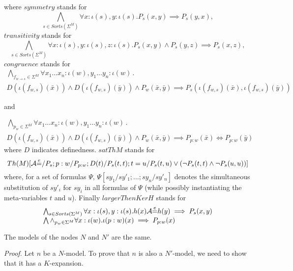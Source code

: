 \begin{itemize}
where $\mathit{symmetry}$ stands for
$$\bigwedge_{s\in Sorts(\Sigma^M)} \forall x:{\iota(s)},y:{\iota(s)}.P_s(x,y)\implies P_s(y, x),$$
$\mathit{transitivity}$ stands for
$$\bigwedge_{s\in Sorts(\Sigma^M)} \forall x:{\iota(s)},y:{\iota(s)},z:{\iota(s)}.P_s(x, y)\land P_s(y, z)\implies P_s(x, z),$$
$\mathit{congruence}$ stands for
$$
\begin{array}{l}
\bigwedge_{f_{w\rightarrow s}\in\Sigma^M} \forall x_1\ldots x_n:{\iota(w)},y_1\ldots y_n:{\iota(w)}\,.\,\,\\
D(\iota(f_{w,s})(\bar{x}))\land D(\iota(f_{w,s})(\bar{y}))\land P_w(\bar{x},\bar{y})
\implies P_s(\iota(f_{w,s})(\bar{x}),\iota(f_{w,s})(\bar{y}))
\end{array}
$$ 

and

$$
\begin{array}{l}
\bigwedge_{p_w \in\Sigma^M} \forall x_1\ldots x_n:{\iota(w)},y_1\ldots y_n:{\iota(w)}\,.\,\,\\
D(\iota(f_{w,s})(\bar{x}))\land D(\iota(f_{w,s})(\bar{y}))\land P_w(\bar{x},\bar{y})
\implies P_{p:w}(\bar{x}) \Leftrightarrow P_{p:w}(\bar{y})
\end{array}
$$
\noindent where $D$ indicates definedness. $\mathit{satThM}$ stands for
$$Th(M)[\mathcal{A}{\stackrel{e}{=}}/P_s; p:w/P_{p:w}; D(t)/P_s(t,t); t=u/P_s(t,u)\lor(\neg P_s(t,t)\land\neg P_s(u,u))]$$
where, for a set of formulas $\Psi$, $\Psi[sy_1/sy'_1;\ldots ;sy_n/sy'_n]$
denotes the simultaneous substitution of $sy'_i$ for $sy_i$ in
all formulas of $\Psi$ (while possibly instantiating the meta-variables
$t$ and $u$).
%
Finally $\mathit{largerThenKerH}$ stands for
$$\begin{array}{l}
\bigwedge_{s\in Sorts(\Sigma^M)} \forall x:{\iota(s)},y:{\iota(s)}.h(x)\mathcal{A}{\stackrel{e}{=}} h(y)\implies P_s(x, y)\\
\bigwedge \land_{p_w\in\Sigma^M} \forall \relax{x}:{\iota(w)}.\iota(p:w)(\relax{x})
\implies P_{p:w}(\relax{x})
\end{array}
$$


\end{itemize}

\begin{proposition}

The models of the nodes $N$ and $N'$ are
the same.

\end{proposition}%

{\noindent\it Proof.}
%
Let $n$ be a $N$-model. To prove that $n$ is also a $N'$-model,
we need to show that it has a $K$-expansion.

